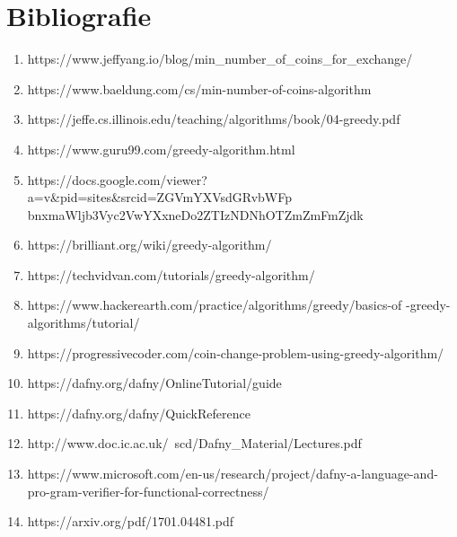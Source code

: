 \chapter*{Bibliografie} 

\begin{enumerate}
    \item https://www.jeffyang.io/blog/min\_number\_of\_coins\_for\_exchange/
    \item https://www.baeldung.com/cs/min-number-of-coins-algorithm
    \item https://jeffe.cs.illinois.edu/teaching/algorithms/book/04-greedy.pdf
    \item https://www.guru99.com/greedy-algorithm.html
    \item https://docs.google.com/viewer?a=v\&pid=sites\&srcid=ZGVmYXVsdGRvbWFp bnxmaWljb3Vyc2VwYXxneDo2ZTIzNDNhOTZmZmFmZjdk
    \item https://brilliant.org/wiki/greedy-algorithm/
    \item https://techvidvan.com/tutorials/greedy-algorithm/
    \item https://www.hackerearth.com/practice/algorithms/greedy/basics-of -greedy-algorithms/tutorial/
    \item https://progressivecoder.com/coin-change-problem-using-greedy-algorithm/
    \item https://dafny.org/dafny/OnlineTutorial/guide
    \item https://dafny.org/dafny/QuickReference
    \item http://www.doc.ic.ac.uk/~scd/Dafny\_Material/Lectures.pdf
    \item https://www.microsoft.com/en-us/research/project/dafny-a-language-and-pro-gram-verifier-for-functional-correctness/
    \item https://arxiv.org/pdf/1701.04481.pdf
\end{enumerate}